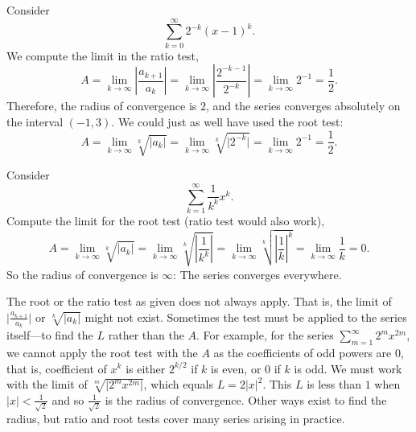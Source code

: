 \begin{example}
Consider
\begin{equation*}
\sum_{k=0}^\infty 2^{-k} {(x-1)}^k .
\end{equation*}
We compute the limit in the ratio test,
\begin{equation*}
A = \lim_{k\to\infty} 
\left \lvert
\frac{a_{k+1}}{a_k}
\right \rvert
=
\lim_{k\to\infty} 
\left \lvert
\frac{2^{-k-1}}{2^{-k}}
\right \rvert
=
\lim_{k\to\infty} 
2^{-1} = \frac{1}{2}.
\end{equation*}
Therefore, the radius of convergence is $2$, and the series
converges absolutely on the interval $(-1,3)$.
We could just as well have used the root test:
\begin{equation*}
A = 
\lim_{k\to\infty} 
\sqrt[k]{\lvert
a_k
\rvert}
=
\lim_{k\to\infty} 
\sqrt[k]{\lvert
2^{-k}
\rvert}
=
\lim_{k\to\infty} 
2^{-1}
=
\frac{1}{2}.
\end{equation*}
\end{example}

\begin{example}
Consider
\begin{equation*}
\sum_{k=1}^\infty \frac{1}{k^k} {x}^k .
\end{equation*}
Compute the limit for the root test (ratio test would also work),
\begin{equation*}
A =
\lim_{k\to\infty} 
\sqrt[k]{\lvert a_k \rvert}
=
\lim_{k\to\infty} 
\sqrt[k]{
\left\lvert\frac{1}{k^k}\right\rvert}
=
\lim_{k\to\infty} 
\sqrt[k]{
{\left\lvert\frac{1}{k}\right\rvert}^{k}}
=
\lim_{k\to\infty} 
\frac{1}{k}
=
0 .
\end{equation*}
So the radius of convergence is $\infty$: The series
converges everywhere. %
\end{example}

The root or the ratio test as given does not always apply.  That is,
the limit
of
$\bigl \lvert \frac{a_{k+1}}{a_k} \bigr \rvert$
or
$\sqrt[k]{\lvert a_k \rvert}$
might not exist.
Sometimes the test must be applied to the series itself---to find
the $L$ rather than the $A$.  For example, for the series
$\sum_{m=1}^\infty 2^m x^{2m}$, we cannot apply the root test with the $A$
as the coefficients of odd powers are $0$, that is,
coefficient of $x^{k}$ is either $2^{k/2}$ if $k$ is even,
or $0$ if $k$ is odd.
We must work with the limit of $\sqrt[m]{\lvert 2^m x^{2m} \rvert}$,
which equals $L = 2 {\lvert x \rvert}^2$.  This $L$ is less than $1$ when
$\lvert x \rvert < \frac{1}{\sqrt{2}}$ and so $\frac{1}{\sqrt{2}}$
is the radius of convergence.
Other ways exist to find the radius, but ratio and root tests
cover many series arising in practice.

